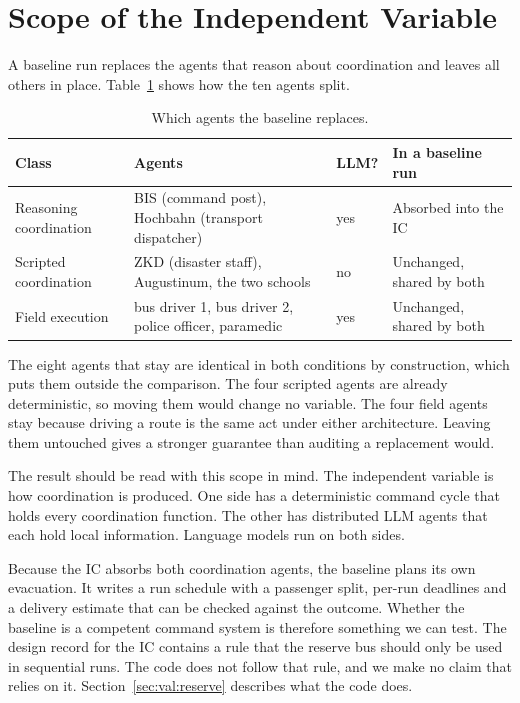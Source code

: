 \section{Scope of the Independent Variable}
\label{sec:val:scope}

A baseline run replaces the agents that reason about coordination and leaves
all others in place. Table~\ref{tab:val:roster} shows how the ten agents split.

\begin{table}[htbp]
\centering
\caption{Which agents the baseline replaces.}
\label{tab:val:roster}
\small
\begin{tabularx}{\textwidth}{>{\raggedright\arraybackslash}p{3.2cm}>{\raggedright\arraybackslash}X>{\raggedright\arraybackslash}p{1.6cm}>{\raggedright\arraybackslash}p{3.4cm}}
\toprule
Class & Agents & LLM? & In a baseline run \\
\midrule
Reasoning coordination & BIS (command post), Hochbahn (transport dispatcher) & yes & Absorbed into the IC \\
Scripted coordination & ZKD (disaster staff), Augustinum, the two schools & no & Unchanged, shared by both \\
Field execution & bus driver 1, bus driver 2, police officer, paramedic & yes & Unchanged, shared by both \\
\bottomrule
\end{tabularx}
\end{table}

The eight agents that stay are identical in both conditions by construction,
which puts them outside the comparison. The four scripted agents are already
deterministic, so moving them would change no variable. The four field agents
stay because driving a route is the same act under either architecture. Leaving
them untouched gives a stronger guarantee than auditing a replacement would.

The result should be read with this scope in mind. The independent variable is
how coordination is produced. One side has a deterministic command cycle that
holds every coordination function. The other has distributed LLM agents that
each hold local information. Language models run on both sides.

Because the IC absorbs both coordination agents, the baseline plans its own
evacuation. It writes a run schedule with a passenger split, per-run deadlines
and a delivery estimate that can be checked against the outcome. Whether the
baseline is a competent command system is therefore something we can test.
The design record for the IC contains a rule that the reserve bus should only
be used in sequential runs. The code does not follow that rule, and we make no
claim that relies on it. Section~\ref{sec:val:reserve} describes what the code
does.

